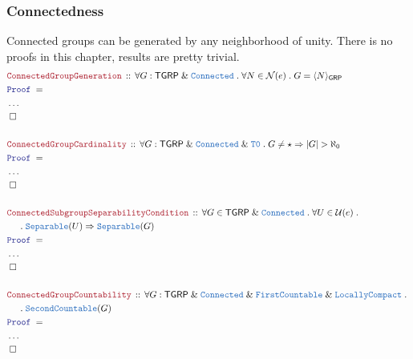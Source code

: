 \documentclass[12pt]{scrartcl}
\newcommand{\TYPE}[1]{\textcolor{NavyBlue}{\mathtt{#1}}}
\newcommand{\LOGIC}[1]{\textcolor{Blue}{\mathtt{#1}}}
\newcommand{\THM}[1]{\textcolor{Maroon}{\mathtt{#1}}}
\renewcommand{\.}{\; . \;}
\newcommand{\Theorem}[2]{& \THM{#1} \, :: \, #2 \\ & \Proof = \\ }
\newcommand{\NewLine}{\\ & \kern 1pc}
\newcommand{\Page}[1]{ \begin{align*} #1 \end{align*}   }
\newcommand{\NoProof}{ & \ldots \\ \EndProof}
\renewcommand{\And}{\; \& \;}
\newcommand{\Imply}{\Rightarrow}
\newcommand{\QED}{\; \square}
\newcommand{\EndProof}{& \QED \\}
\newcommand{\Proof}{\LOGIC{Proof} \; }
\newcommand{\Separable}{\TYPE{Separable}}
\newcommand{\LC}{\TYPE{LocallyCompact}}
\newcommand{\Connected}{\TYPE{Connected}}
\renewcommand{\U}{\mathcal{U}}
\newcommand{\GRP}{\mathsf{GRP}}
\newcommand{\TGRP}{\mathsf{TGRP}}
\begin{document}
\subsubsection{Connectedness}
Connected groups can be generated by any neighborhood of unity.
There is no proofs in this chapter, results are pretty trivial.
\Page{
	\Theorem{ConnectedGroupGeneration}
	{
      \forall G : \TGRP \And \Connected	\. 
      \forall N \in \mathcal{N}(e) \.
      G = \langle N \rangle_\GRP
	}
	\NoProof
	\\
	\Theorem{ConnectedGroupCardinality}
	{
		\forall G : \TGRP \And \Connected \And \TYPE{T0} \.
		G \neq \star \Imply |G| > \aleph_0
	}
	\NoProof
	\\
	\Theorem{ConnectedSubgroupSeparabilityCondition}
	{
		\forall G \in \TGRP \And \Connected \.
		\forall U \in \U(e) \. \NewLine \.
		\Separable(U)
		\Imply \Separable(G)
	}
	\NoProof
	\\
	\Theorem{ConnectedGroupCountability}
	{
		\forall G : \TGRP \And \Connected \And \TYPE{FirstCountable} \And \LC \.
		\NewLine \.
		\TYPE{SecondCountable}(G)
	}
	\NoProof
}
\newpage
\end{document}
